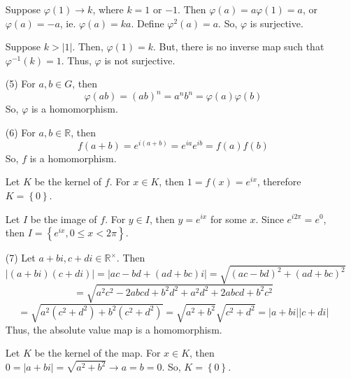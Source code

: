 \documentclass[12pt]{article}
\begin{document}
\begin{itemize}
Suppose $\varphi(1) \rightarrow k$, where $k = 1$ or $-1$. Then $\varphi(a) = a\varphi(1) = a$, or $\varphi(a) = -a$, ie. $\varphi(a) = ka$. Define $\varphi^2(a) = a$. So, $\varphi$ is surjective.

Suppose $k > |1|$. Then, $\varphi(1) = k$. But, there is no inverse map such that $\varphi^{-1}(k) = 1$. Thus, $\varphi$ is not surjective.
\item[(5)]
For $a, b \in G$, then
$$\varphi(ab) = (ab)^n = a^nb^n = \varphi(a)\varphi(b)$$
So, $\varphi$ is a homomorphism.
\item[(6)]
For $a, b \in \mathbb{R}$, then
$$f(a+b) = e^{i(a+b)} = e^{ia}e^{ib} = f(a)f(b)$$
So, $f$ is a homomorphism. 

Let $K$ be the kernel of $f$. For $x \in K$, then $1 = f(x) = e^{ix}$, therefore $K = \left\lbrace 0 \right\rbrace$.

Let $I$ be the image of $f$. For $y \in I$, then $y = e^{ix}$ for some $x$. Since $e^{i2\pi} = e^0$, then $I = \left\lbrace e^{ix}, 0 \leq x < 2\pi \right\rbrace$. 
\item[(7)]
Let $a + bi, c + di \in \mathbb{R}^\times$. Then
$$|(a+bi)(c+di)| = |ac - bd + (ad + bc)i| = \sqrt{(ac-bd)^2 + (ad+bc)^2}$$
$$= \sqrt{a^2c^2 - 2abcd + b^2d^2 + a^2d^2 + 2abcd + b^2c^2}$$ 
$$= \sqrt{a^2(c^2 + d^2) + b^2(c^2 + d^2)} = \sqrt{a^2+b^2}\sqrt{c^2+d^2} = |a+bi||c+di|$$
Thus, the absolute value map is a homomorphism.

Let $K$ be the kernel of the map. For $x \in K$, then $0 = |a + bi| = \sqrt{a^2 + b^2} \rightarrow a = b = 0$. So, $K = \left\lbrace 0 \right\rbrace$.


\end{itemize}
\end{document}

